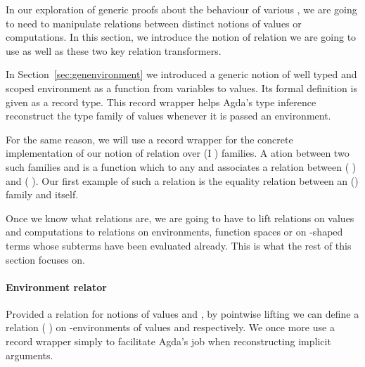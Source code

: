 In our exploration of generic proofs about the behaviour of various ,
we are going to need to manipulate relations between distinct notions of values or
computations. In this section, we introduce the notion of relation we are going to
use as well as these two key relation transformers.

In Section~\ref{sec:genenvironment} we introduced a generic notion of well typed
and scoped environment as a function from variables to values. Its formal definition
is given as a record type. This record wrapper helps
Agda's type inference reconstruct the type family of values whenever it is passed an
environment.

For the same reason, we will use a record wrapper for the concrete implementation of
our notion of relation over (I ) families. A ation between two
such families  and  is a function which to any  and  associates
a relation between (  ) and (  ). Our first example
of such a relation is  the equality relation between an ()
family  and itself.

\noindent
\begin{minipage}{\textwidth}
  \begin{minipage}[t]{0.65\textwidth}
  \end{minipage}
  \begin{minipage}[t]{0.25\textwidth}
  \end{minipage}
\end{minipage}

Once we know what relations are, we are going to have to lift relations on values
and computations to relations on environments,  function spaces or
on -shaped terms whose subterms have been evaluated already.
This is what the rest of this section focuses on.

\paragraph*{Environment relator}
Provided a relation  for notions of values  and , by
pointwise lifting we can define a relation {(  )} on
-environments of values  and  respectively. We once more
use a record wrapper simply to facilitate Agda's job when reconstructing
implicit arguments.

